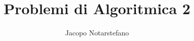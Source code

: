 \documentclass[a4paper, 12pt]{book}
\theoremstyle{plain}
\begin{document}
    \title{Problemi di Algoritmica 2}
    \author{Jacopo Notarstefano}
    
    \maketitle

    
    
    
    
    
\end{document}
